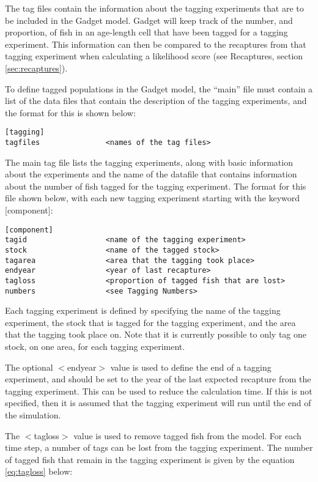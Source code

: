 \documentclass[]{book}
\begin{document}
The tag files contain the information about the tagging experiments that
are to be included in the Gadget model. Gadget will keep track of the
number, and proportion, of fish in an age-length cell that have been
tagged for a tagging experiment. This information can then be compared
to the recaptures from that tagging experiment when calculating a
likelihood score (see Recaptures,
section \ref{sec:recaptures}).

To define tagged populations in the Gadget model, the ``main'' file must
contain a list of the data files that contain the description of the
tagging experiments, and the format for this is shown below:

\begin{verbatim}
[tagging]
tagfiles               <names of the tag files>
\end{verbatim}

The main tag file lists the tagging experiments, along with basic
information about the experiments and the name of the datafile that
contains information about the number of fish tagged for the tagging
experiment. The format for this file shown below, with each new tagging
experiment starting with the keyword {[}component{]}:

\begin{verbatim}
[component]
tagid                  <name of the tagging experiment>
stock                  <name of the tagged stock>
tagarea                <area that the tagging took place>
endyear                <year of last recapture>
tagloss                <proportion of tagged fish that are lost>
numbers                <see Tagging Numbers>
\end{verbatim}

Each tagging experiment is defined by specifying the name of the tagging
experiment, the stock that is tagged for the tagging experiment, and the
area that the tagging took place on. Note that it is currently possible
to only tag one stock, on one area, for each tagging experiment.

The optional \(<\)endyear\(>\) value is used to define the end of a tagging
experiment, and should be set to the year of the last expected recapture
from the tagging experiment. This can be used to reduce the calculation
time. If this is not specified, then it is assumed that the tagging
experiment will run until the end of the simulation.

The \(<\)tagloss\(>\) value is used to remove tagged fish from the model.
For each time step, a number of tags can be lost from the tagging
experiment. The number of tagged fish that remain in the tagging
experiment is given by the
equation \eqref{eq:tagloss} below:
\end{document}
